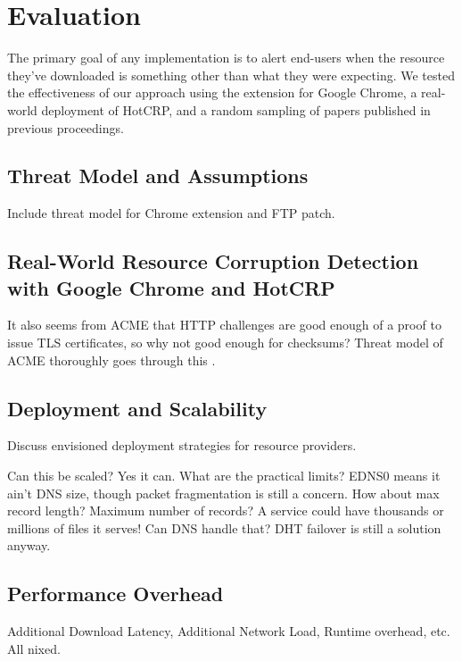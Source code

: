 \section{Evaluation} \label{sec:evaluation}

The primary goal of any \SYSTEM{} implementation is to alert end-users when the
resource they've downloaded is something other than what they were expecting. We
tested the effectiveness of our approach using the \SYSTEM{} extension for
Google Chrome, a real-world deployment of HotCRP, and a random sampling of
papers published in previous \CONFERENCE{} proceedings.

\subsection{Threat Model and Assumptions}

Include threat model for Chrome extension and FTP patch.

\subsection{Real-World Resource Corruption Detection with Google Chrome and HotCRP}

It also seems from ACME that HTTP challenges are good enough of a proof to issue
TLS certificates, so why not good enough for checksums? Threat model of ACME
thoroughly goes through this \cite{draft-ACME}.

\subsection{Deployment and Scalability}

Discuss envisioned deployment strategies for resource providers.

Can this be scaled? Yes it can. What are the practical limits? EDNS0 means it
ain't DNS size, though packet fragmentation is still a concern. How about max
record length? Maximum number of records? A service could have thousands or
millions of files it serves! Can DNS handle that? DHT failover is still a
solution anyway.

\subsection{Performance Overhead}

Additional Download Latency, Additional Network Load, Runtime overhead, etc. All
nixed.
